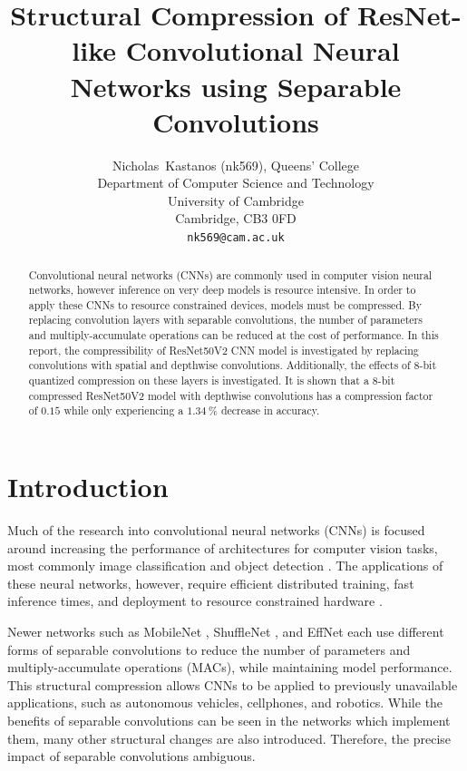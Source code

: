 \documentclass{article}
\title{Structural Compression of ResNet-like Convolutional Neural Networks using Separable Convolutions}
\author{%
	Nicholas~Kastanos (nk569), Queens' College \\
	Department of Computer Science and Technology\\
	University of Cambridge\\
	Cambridge, CB3 0FD\\
	\texttt{nk569@cam.ac.uk} \\
}
\begin{document}
	
	\maketitle
	
	\begin{abstract}
		Convolutional neural networks (CNNs) are commonly used in computer vision neural networks, however inference on very deep models is resource intensive. In order to apply these CNNs to resource constrained devices, models must be compressed. By replacing convolution layers with separable convolutions, the number of parameters and multiply-accumulate operations can be reduced at the cost of performance. In this report, the compressibility of ResNet50V2 CNN model is investigated by replacing convolutions with spatial and depthwise convolutions. Additionally, the effects of 8-bit quantized compression on these layers is investigated. It is shown that a 8-bit compressed ResNet50V2 model with depthwise convolutions has a compression factor of $0.15$ while only experiencing a $1.34~\%$ decrease in accuracy.
	\end{abstract}
	
	\section{Introduction}
	
	Much of the research into convolutional neural networks (CNNs) is focused around increasing the performance of architectures for computer vision tasks, most commonly image classification and object detection \cite{resnetv1, vgg, yolo, inception, adscnet}. The applications of these neural networks, however, require efficient distributed training, fast inference times, and deployment to resource constrained hardware \cite{scalable8bit,mobilenet}. 
	
	Newer networks such as MobileNet \cite{mobilenet}, ShuffleNet \cite{shufflenet}, and EffNet \cite{effnet} each use different forms of separable convolutions to reduce the number of parameters and multiply-accumulate operations (MACs), while maintaining model performance. This structural compression allows CNNs to be applied to previously unavailable applications, such as autonomous vehicles, cellphones, and robotics. While the benefits of separable convolutions can be seen in the networks which implement them, many other structural changes are also introduced. Therefore, the precise impact of separable convolutions ambiguous.
	
\end{document}
